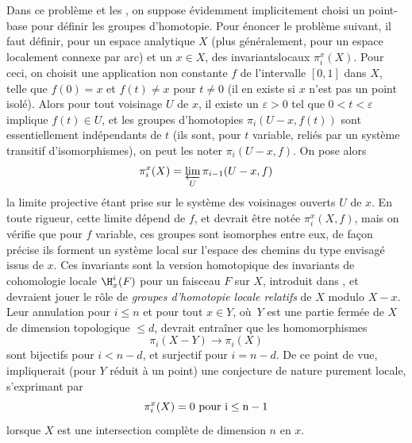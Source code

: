 \enlargethispage{\baselineskip}%
Dans ce probl\`eme et les , on suppose \'evidemment implicitement choisi un point-base pour d\'efinir les groupes d'homotopie. Pour \'enoncer le probl\`eme suivant, il faut d\'efinir, pour un espace analytique $X$ (plus g\'en\'eralement, pour un espace localement connexe par arc) et un $x\in X$, des invariants\pageoriginale locaux $\pi_i^x(X)$.\label{pagexpo} Pour ceci, on choisit une application non constante $f$ de l'intervalle $[0, 1]$ dans $X$, telle que $f(0)=x$ et $f(t)\neq x$ pour $t\neq 0$ (il en existe si $x$ n'est pas un point isol\'e). Alors pour tout voisinage $U$ de $x$, il existe un $\varepsilon>0$ tel que $0<t<\varepsilon$ implique $f(t)\in U$, et les groupes d'homotopies $\pi_i(U-x, f(t))$ sont essentiellement ind\'ependants de $t$ (ils sont, pour $t$ variable, reli\'es par un syst\`eme transitif d'isomorphismes), on peut les noter $\pi_i(U-x, f)$. On pose alors\label{pip15}\label{pXIII.15}
$$
\pi_i^x(X)= \varprojlim_{U}\pi_{i-1}(U-x, f)
$$
la limite projective \'etant prise sur le syst\`eme des voisinages ouverts $U$ de $x$. En toute rigueur, cette limite d\'epend de $f$, et devrait \^etre not\'ee $\pi_i^x(X, f)$, mais on v\'erifie que pour $f$ variable, ces groupes sont isomorphes entre eux, de fa\c con pr\'ecise ils forment un syst\`eme local sur l'espace des chemins du type envisag\'e issus de $x$. Ces invariants sont la version homotopique des invariants de cohomologie locale $\H^i_x(F)$ pour un faisceau $F$ sur $X$, introduit dans , et devraient jouer le r\^{o}le de \emph{groupes d'homotopie locale relatifs} de $X$ modulo $X-x$. Leur annulation pour $i\le n$ et pour tout $x\in Y$, o\`u~$Y$ est une partie ferm\'ee de $X$ de dimension topologique $\le d$, devrait entra\^iner que les homomorphismes
$$
\pi_i(X-Y) \to \pi_i(X)
$$
sont bijectifs pour $i<n-d$, et surjectif pour $i=n-d$. De ce point de vue,  impliquerait (pour $Y$ r\'eduit \`a un point) une conjecture de nature purement locale, s'exprimant par 
$$
\pi_i^x(X)=0 \rm{\ pour\ } i\le n-1\label{p15l}
$$
lorsque $X$ est une intersection compl\`ete de dimension $n$ en $x$.


